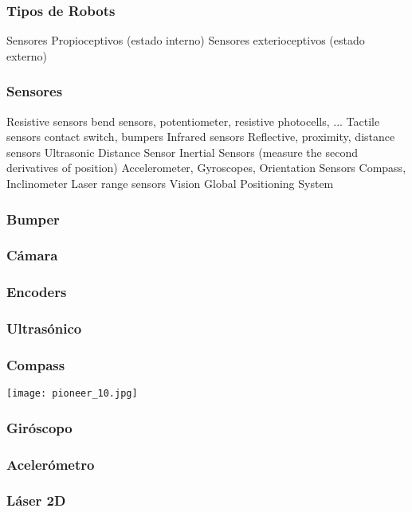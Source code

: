 \begin{frame}
    \frametitle{Tipos de Robots}

    Sensores Propioceptivos (estado interno)
    Sensores exterioceptivos (estado externo)

\end{frame}


\begin{frame}
    \frametitle{Sensores}
    Resistive sensors
    bend sensors, potentiometer, resistive
    photocells, ...
    Tactile sensors
    contact switch, bumpers
    Infrared sensors
    Reflective, proximity, distance sensors
    Ultrasonic Distance Sensor
    Inertial Sensors (measure the second derivatives
    of position)
    Accelerometer, Gyroscopes,
    Orientation Sensors
    Compass, Inclinometer
    Laser range sensors
    Vision
    Global Positioning System
\end{frame}


\begin{frame}
	\frametitle{Bumper}

\end{frame}

\begin{frame}
	\frametitle{Cámara}

\end{frame}

\begin{frame}
	\frametitle{Encoders}

\end{frame}

\begin{frame}
	\frametitle{Ultrasónico}

\end{frame}

\begin{frame}
	\frametitle{Compass}
	\texttt{[image: pioneer\_10.jpg]}
\end{frame}

\begin{frame}
	\frametitle{Giróscopo}

\end{frame}

\begin{frame}
	\frametitle{Acelerómetro}

\end{frame}

\begin{frame}
	\frametitle{Láser 2D}

\end{frame}

